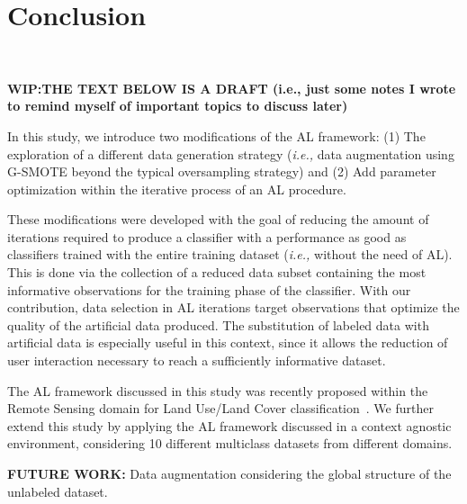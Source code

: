 \documentclass[parskip=full]{scrartcl}
\begin{document}
\section{Conclusion}~\label{sec:conclusion}

\textbf{WIP:\@ THE TEXT BELOW IS A DRAFT (i.e., just some notes I wrote to
remind myself of important topics to discuss later)}

In this study, we introduce two modifications of the AL framework: (1) The
exploration of a different data generation strategy (\textit{i.e.,} data
augmentation using G-SMOTE beyond the typical oversampling strategy) and (2)
Add parameter optimization within the iterative process of an AL procedure.

These modifications were developed with the goal of reducing the amount of
iterations required to produce a classifier with a performance as good as
classifiers trained with the entire training dataset (\textit{i.e.,} without
the need of AL). This is done via the collection of a reduced data subset
containing the most informative observations for the training phase of the
classifier. With our contribution, data selection in AL iterations target
observations that optimize the quality of the artificial data produced. The
substitution of labeled data with artificial data is especially useful in this
context, since it allows the reduction of user interaction necessary to reach
a sufficiently informative dataset.

The AL framework discussed in this study was recently proposed within the Remote
Sensing domain for Land Use/Land Cover classification~\cite{Fonseca2021}. We
further extend this study by applying the AL framework discussed in a context
agnostic environment, considering 10 different multiclass datasets from
different domains.

\textbf{FUTURE WORK:} Data augmentation considering the global structure of
the unlabeled dataset.



\end{document}
